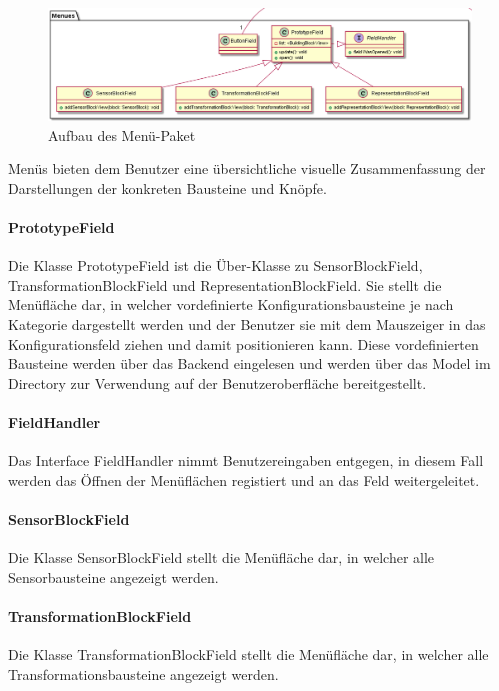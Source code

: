 \documentclass[parskip=full]{scrartcl}
\begin{document}
\begin{figure}[htbp]
	\begin{center}
		\includegraphics[width = 14cm]{Grafiken/View/MenuesNamespace.PNG}
		\caption{Aufbau des Menü-Paket}
		\label{Menues}
	\end{center}
\end{figure}

Menüs bieten dem Benutzer eine übersichtliche visuelle Zusammenfassung der Darstellungen der konkreten Bausteine und Knöpfe. 


\paragraph{PrototypeField}
Die Klasse PrototypeField ist die Über-Klasse zu SensorBlockField, TransformationBlockField und RepresentationBlockField. 
Sie stellt die Menüfläche dar, in welcher vordefinierte Konfigurationsbausteine je nach Kategorie dargestellt werden und der Benutzer sie mit dem Mauszeiger in das Konfigurationsfeld ziehen und damit positionieren kann. Diese vordefinierten Bausteine werden über das Backend eingelesen und werden über das Model im Directory zur Verwendung auf der Benutzeroberfläche bereitgestellt.

\paragraph{FieldHandler}
Das Interface FieldHandler nimmt Benutzereingaben entgegen, in diesem Fall werden das Öffnen der Menüflächen registiert und an das Feld weitergeleitet.

\paragraph{SensorBlockField}
Die Klasse SensorBlockField stellt die Menüfläche dar, in welcher alle Sensorbausteine angezeigt werden.

\paragraph{TransformationBlockField}
Die Klasse TransformationBlockField stellt die Menüfläche dar, in welcher alle Transformationsbausteine angezeigt werden.
\end{document}
